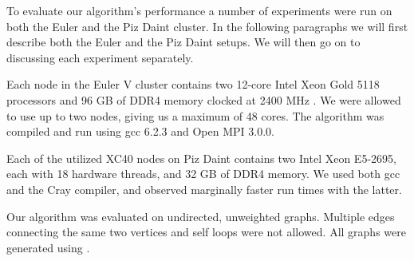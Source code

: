 To evaluate our algorithm's performance a number of experiments were run on both the Euler and the
Piz Daint cluster. In the following paragraphs we will first describe both the Euler and the Piz
Daint setups. We will then go on to discussing each experiment separately.

Each node in the Euler V cluster contains two 12-core Intel Xeon Gold 5118 processors and 96 GB of
DDR4 memory clocked at 2400 MHz \cite{Euler}. We were allowed to use up to two nodes, giving us a
maximum of 48 cores. The algorithm was compiled and run using gcc 6.2.3 and Open MPI 3.0.0.

Each of the utilized XC40 nodes on Piz Daint contains two Intel Xeon E5-2695, each with 18 hardware
threads,
and 32 GB of DDR4 memory. We used both gcc and the Cray compiler, and observed marginally faster
run times with the latter.

Our algorithm was evaluated on undirected, unweighted graphs. Multiple edges connecting the same
two vertices and self loops were not allowed. All graphs were generated using \cite{Parmat}.


